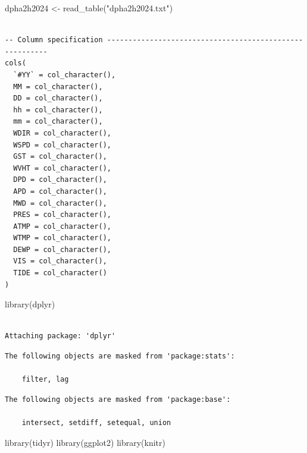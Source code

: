 \documentclass[
  letterpaper,
  DIV=11,
  numbers=noendperiod]{scrreprt}
\newenvironment{Shaded}{\begin{snugshade}}{\end{snugshade}}
\newcommand{\FunctionTok}[1]{\textcolor[rgb]{0.28,0.35,0.67}{#1}}
\newcommand{\NormalTok}[1]{\textcolor[rgb]{0.00,0.23,0.31}{#1}}
\newcommand{\OtherTok}[1]{\textcolor[rgb]{0.00,0.23,0.31}{#1}}
\newcommand{\StringTok}[1]{\textcolor[rgb]{0.13,0.47,0.30}{#1}}
\begin{document}
\begin{Shaded}
\begin{Highlighting}[]
\NormalTok{dpha2h2024 }\OtherTok{\textless{}{-}} \FunctionTok{read\_table}\NormalTok{(}\StringTok{"dpha2h2024.txt"}\NormalTok{)}
\end{Highlighting}
\end{Shaded}

\begin{verbatim}

-- Column specification --------------------------------------------------------
cols(
  `#YY` = col_character(),
  MM = col_character(),
  DD = col_character(),
  hh = col_character(),
  mm = col_character(),
  WDIR = col_character(),
  WSPD = col_character(),
  GST = col_character(),
  WVHT = col_character(),
  DPD = col_character(),
  APD = col_character(),
  MWD = col_character(),
  PRES = col_character(),
  ATMP = col_character(),
  WTMP = col_character(),
  DEWP = col_character(),
  VIS = col_character(),
  TIDE = col_character()
)
\end{verbatim}

\begin{Shaded}
\begin{Highlighting}[]
\FunctionTok{library}\NormalTok{(dplyr)}
\end{Highlighting}
\end{Shaded}

\begin{verbatim}

Attaching package: 'dplyr'
\end{verbatim}

\begin{verbatim}
The following objects are masked from 'package:stats':

    filter, lag
\end{verbatim}

\begin{verbatim}
The following objects are masked from 'package:base':

    intersect, setdiff, setequal, union
\end{verbatim}

\begin{Shaded}
\begin{Highlighting}[]
\FunctionTok{library}\NormalTok{(tidyr)}
\FunctionTok{library}\NormalTok{(ggplot2)}
\FunctionTok{library}\NormalTok{(knitr)}
\end{Highlighting}
\end{Shaded}
\end{document}

